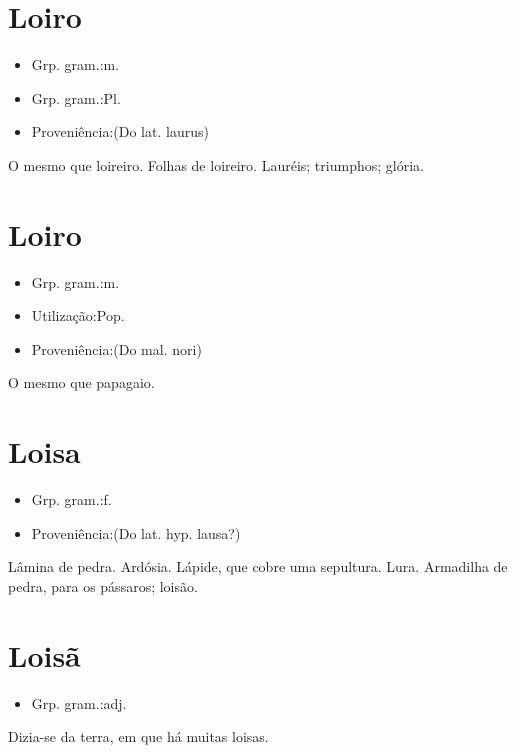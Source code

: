 \section{Loiro}
\begin{itemize}
\item {Grp. gram.:m.}
\end{itemize}
\begin{itemize}
\item {Grp. gram.:Pl.}
\end{itemize}
\begin{itemize}
\item {Proveniência:(Do lat. \textunderscore laurus\textunderscore )}
\end{itemize}
O mesmo que \textunderscore loireiro\textunderscore .
Folhas de loireiro.
Lauréis; triumphos; glória.
\section{Loiro}
\begin{itemize}
\item {Grp. gram.:m.}
\end{itemize}
\begin{itemize}
\item {Utilização:Pop.}
\end{itemize}
\begin{itemize}
\item {Proveniência:(Do mal. \textunderscore nori\textunderscore )}
\end{itemize}
O mesmo que \textunderscore papagaio\textunderscore .
\section{Loisa}
\begin{itemize}
\item {Grp. gram.:f.}
\end{itemize}
\begin{itemize}
\item {Proveniência:(Do lat. hyp. \textunderscore lausa\textunderscore ?)}
\end{itemize}
Lâmina de pedra.
Ardósia.
Lápide, que cobre uma sepultura.
Lura.
Armadilha de pedra, para os pássaros; loisão.
\section{Loisã}
\begin{itemize}
\item {Grp. gram.:adj.}
\end{itemize}
Dizia-se da terra, em que há muitas loisas.
